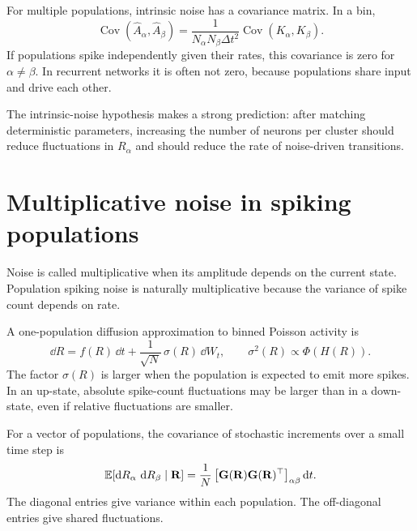 For multiple populations, intrinsic noise has a covariance matrix. In a bin,
%
\begin{equation}
  \operatorname{Cov}(\widehat A_\alpha,\widehat A_\beta)
  =
  \frac{1}{N_\alpha N_\beta\Delta t^2}
  \operatorname{Cov}(K_\alpha,K_\beta).
  \label{eq:activity-covariance-counts}
\end{equation}
%
If populations spike independently given their rates, this covariance is zero for $\alpha\ne\beta$. In recurrent networks it is often not zero, because populations share input and drive each other.

The intrinsic-noise hypothesis makes a strong prediction: after matching deterministic parameters, increasing the number of neurons per cluster should reduce fluctuations in $R_\alpha$ and should reduce the rate of noise-driven transitions.

\section{Multiplicative noise in spiking populations}
\label{sec:multiplicative-noise-spiking-populations}

Noise is called multiplicative when its amplitude depends on the current state. Population spiking noise is naturally multiplicative because the variance of spike count depends on rate.

A one-population diffusion approximation to binned Poisson activity is
%
\begin{equation}
  \dd R
  =
  f(R)\,\dd t
  +
  \frac{1}{\sqrt{N}}\,
  \sigma(R)\,\dd W_t,
  \qquad
  \sigma^2(R)\propto \Phi(H(R)).
  \label{eq:multiplicative-noise-one-pop}
\end{equation}
%
The factor $\sigma(R)$ is larger when the population is expected to emit more spikes. In an up-state, absolute spike-count fluctuations may be larger than in a down-state, even if relative fluctuations are smaller.

For a vector of populations, the covariance of stochastic increments over a small time step is
%
\begin{equation}
  \mathbb{E}[\mathop{}\!\mathrm{d} R_\alpha\,\mathop{}\!\mathrm{d} R_\beta\mid \mathbf{R}]
  =
  \frac{1}{N}
  \left[
    \mathbf{G}(\mathbf{R})\mathbf{G}(\mathbf{R})^\top
  \right]_{\alpha\beta}
  \mathop{}\!\mathrm{d} t.
  \label{eq:multiplicative-noise-covariance}
\end{equation}
%
The diagonal entries give variance within each population. The off-diagonal entries give shared fluctuations.

